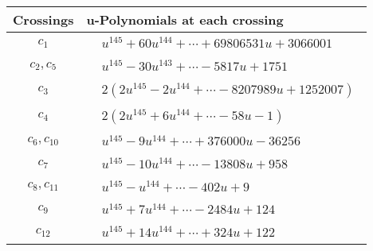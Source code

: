 \documentclass[1p]{elsarticle_modified}
\theoremstyle{definition}
\begin{document}
\begin{tabular}{m{50pt}|m{274pt}}
Crossings & \hspace{64pt}u-Polynomials at each crossing \\
\hline $$\begin{aligned}c_{1}\end{aligned}$$&$\begin{aligned}
&u^{145}+60 u^{144}+\cdots+69806531 u+3066001
\end{aligned}$\\
\hline $$\begin{aligned}c_{2},c_{5}\end{aligned}$$&$\begin{aligned}
&u^{145}-30 u^{143}+\cdots-5817 u+1751
\end{aligned}$\\
\hline $$\begin{aligned}c_{3}\end{aligned}$$&$\begin{aligned}
&2(2 u^{145}-2 u^{144}+\cdots-8207989 u+1252007)
\end{aligned}$\\
\hline $$\begin{aligned}c_{4}\end{aligned}$$&$\begin{aligned}
&2(2 u^{145}+6 u^{144}+\cdots-58 u-1)
\end{aligned}$\\
\hline $$\begin{aligned}c_{6},c_{10}\end{aligned}$$&$\begin{aligned}
&u^{145}-9 u^{144}+\cdots+376000 u-36256
\end{aligned}$\\
\hline $$\begin{aligned}c_{7}\end{aligned}$$&$\begin{aligned}
&u^{145}-10 u^{144}+\cdots-13808 u+958
\end{aligned}$\\
\hline $$\begin{aligned}c_{8},c_{11}\end{aligned}$$&$\begin{aligned}
&u^{145}- u^{144}+\cdots-402 u+9
\end{aligned}$\\
\hline $$\begin{aligned}c_{9}\end{aligned}$$&$\begin{aligned}
&u^{145}+7 u^{144}+\cdots-2484 u+124
\end{aligned}$\\
\hline $$\begin{aligned}c_{12}\end{aligned}$$&$\begin{aligned}
&u^{145}+14 u^{144}+\cdots+324 u+122
\end{aligned}$\\
\hline
\end{tabular}\\~\\
\end{document}
